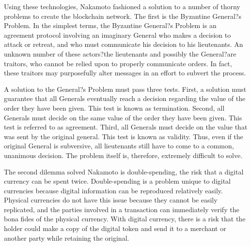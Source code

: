 \documentclass[11pt, oneside]{article}   	%
\begin{document}
	Using these technologies, Nakamoto fashioned a solution to a number of thorny problems to create the blockchain network. The first is the Byzantine General?s Problem. In the simplest terms, the Byzantine General?s Problem is an agreement protocol involving an imaginary General who makes a decision to attack or retreat, and who must communicate his decision to his lieutenants. An unknown number of these actors?the lieutenants and possibly the General?are traitors, who cannot be relied upon to properly communicate orders. In fact, these traitors may purposefully alter messages in an effort to subvert the process. 
		\par
	A solution to the General?s Problem must pass three tests. First, a solution must guarantee that all Generals eventually reach a decision regarding the value of the order they have been given. This test is known as termination. Second, all Generals must decide on the same value of the order they have been given. This test is referred to as agreement. Third, all Generals must decide on the value that was sent by the original general. This test is known as validity. Thus, even if the original General is subversive, all lieutenants still have to come to a common, unanimous decision. The problem itself is, therefore, extremely difficult to solve. 
		\par
	The second dilemma solved Nakamoto is double-spending, the risk that a digital currency can be spent twice. Double-spending is a problem unique to digital currencies because digital information can be reproduced relatively easily. Physical currencies do not have this issue because they cannot be easily replicated, and the parties involved in a transaction can immediately verify the bona fides of the physical currency. With digital currency, there is a risk that the holder could make a copy of the digital token and send it to a merchant or another party while retaining the original.
		\par
\end{document}

